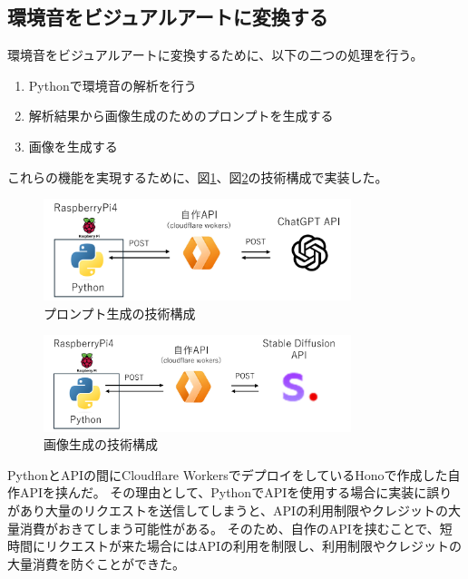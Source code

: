 \subsection{環境音をビジュアルアートに変換する}
環境音をビジュアルアートに変換するために、以下の二つの処理を行う。
\begin{enumerate}
  \item Pythonで環境音の解析を行う
  \item 解析結果から画像生成のためのプロンプトを生成する
  \item 画像を生成する
\end{enumerate}
これらの機能を実現するために、図\ref{fig:generate-prompt}、図\ref{fig:generate-image}の技術構成で実装した。
\begin{figure}[h]
  \centering
  \includegraphics[width=0.8\textwidth]{pages/report/images/opeai-api.png}
  \caption{プロンプト生成の技術構成}
  \label{fig:generate-prompt}
\end{figure}
\begin{figure}[h]
  \centering
  \includegraphics[width=0.8\textwidth]{pages/report/images/generate-image.png}
  \caption{画像生成の技術構成}
  \label{fig:generate-image}
\end{figure}
PythonとAPIの間にCloudflare WorkersでデプロイをしているHonoで作成した自作APIを挟んだ。
その理由として、PythonでAPIを使用する場合に実装に誤りがあり大量のリクエストを送信してしまうと、APIの利用制限やクレジットの大量消費がおきてしまう可能性がある。
そのため、自作のAPIを挟むことで、短時間にリクエストが来た場合にはAPIの利用を制限し、利用制限やクレジットの大量消費を防ぐことができた。

